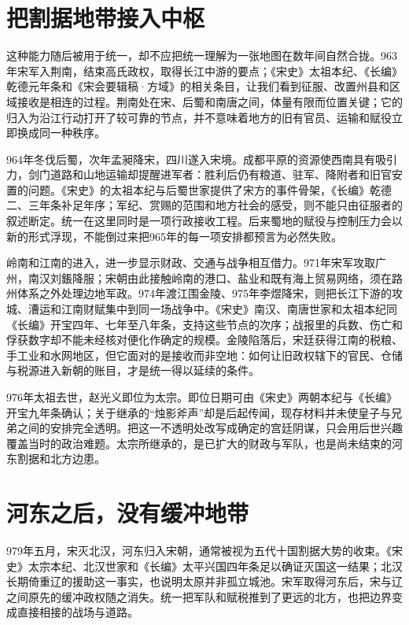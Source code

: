 \section{把割据地带接入中枢}

这种能力随后被用于统一，却不应把统一理解为一张地图在数年间自然合拢。963年宋军入荆南，结束高氏政权，取得长江中游的要点；《宋史》太祖本纪、《长编》乾德元年条和《宋会要辑稿·方域》的相关条目，让我们看到征服、改置州县和区域接收是相连的过程。荆南处在宋、后蜀和南唐之间，体量有限而位置关键；它的归入为沿江行动打开了较可靠的节点，并不意味着地方的旧有官员、运输和赋役立即换成同一种秩序。

964年冬伐后蜀，次年孟昶降宋，四川遂入宋境。成都平原的资源使西南具有吸引力，剑门道路和山地运输却提醒进军者：胜利后仍有粮道、驻军、降附者和旧官安置的问题。《宋史》的太祖本纪与后蜀世家提供了宋方的事件骨架，《长编》乾德二、三年条补足年序；军纪、赏赐的范围和地方社会的感受，则不能只由征服者的叙述断定。统一在这里同时是一项行政接收工程。后来蜀地的赋役与控制压力会以新的形式浮现，不能倒过来把965年的每一项安排都预言为必然失败。

岭南和江南的进入，进一步显示财政、交通与战争相互借力。971年宋军攻取广州，南汉刘鋹降服；宋朝由此接触岭南的港口、盐业和既有海上贸易网络，须在路州体系之外处理边地军政。974年渡江围金陵、975年李煜降宋，则把长江下游的攻城、漕运和江南财赋集中到同一场战争中。《宋史》南汉、南唐世家和太祖本纪同《长编》开宝四年、七年至八年条，支持这些节点的次序；战报里的兵数、伤亡和俘获数字却不能未经核对便化作确定的规模。金陵陷落后，宋廷获得江南的税粮、手工业和水网地区，但它面对的是接收而非空地：如何让旧政权辖下的官民、仓储与税源进入新朝的账目，才是统一得以延续的条件。



976年太祖去世，赵光义即位为太宗。即位日期可由《宋史》两朝本纪与《长编》开宝九年条确认；关于继承的“烛影斧声”却是后起传闻，现存材料并未使皇子与兄弟之间的安排完全透明。把这一不透明处改写成确定的宫廷阴谋，只会用后世兴趣覆盖当时的政治难题。太宗所继承的，是已扩大的财政与军队，也是尚未结束的河东割据和北方边患。

\section{河东之后，没有缓冲地带}

979年五月，宋灭北汉，河东归入宋朝，通常被视为五代十国割据大势的收束。《宋史》太宗本纪、北汉世家和《长编》太平兴国四年条足以确证灭国这一结果；北汉长期倚重辽的援助这一事实，也说明太原并非孤立城池。宋军取得河东后，宋与辽之间原先的缓冲政权随之消失。统一把军队和赋税推到了更远的北方，也把边界变成直接相接的战场与道路。

